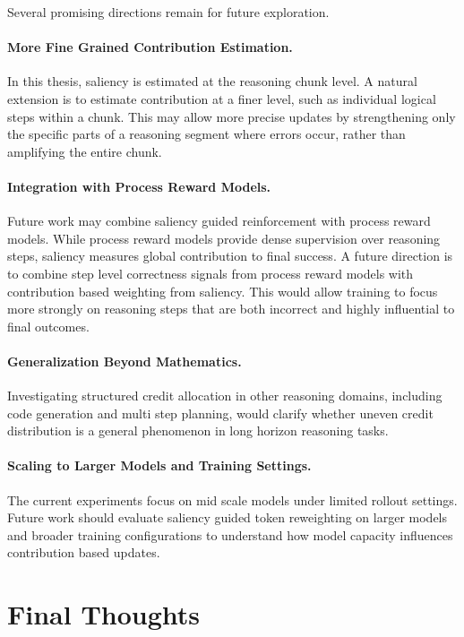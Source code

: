 \documentclass[12pt]{report}
\begin{document}
Several promising directions remain for future exploration.

\paragraph{More Fine Grained Contribution Estimation.}
In this thesis, saliency is estimated at the reasoning chunk level. A natural extension is to estimate contribution at a finer level, such as individual logical steps within a chunk. This may allow more precise updates by strengthening only the specific parts of a reasoning segment where errors occur, rather than amplifying the entire chunk.

\paragraph{Integration with Process Reward Models.}
Future work may combine saliency guided reinforcement with process reward models. While process reward models provide dense supervision over reasoning steps, saliency measures global contribution to final success. A future direction is to combine step level correctness signals from process reward models with contribution based weighting from saliency. This would allow training to focus more strongly on reasoning steps that are both incorrect and highly influential to final outcomes.

\paragraph{Generalization Beyond Mathematics.}
Investigating structured credit allocation in other reasoning domains, including code generation and multi step planning, would clarify whether uneven credit distribution is a general phenomenon in long horizon reasoning tasks.

\paragraph{Scaling to Larger Models and Training Settings.}
The current experiments focus on mid scale models under limited rollout settings. Future work should evaluate saliency guided token reweighting on larger models and broader training configurations to understand how model capacity influences contribution based updates.

\section{Final Thoughts}
\end{document}
